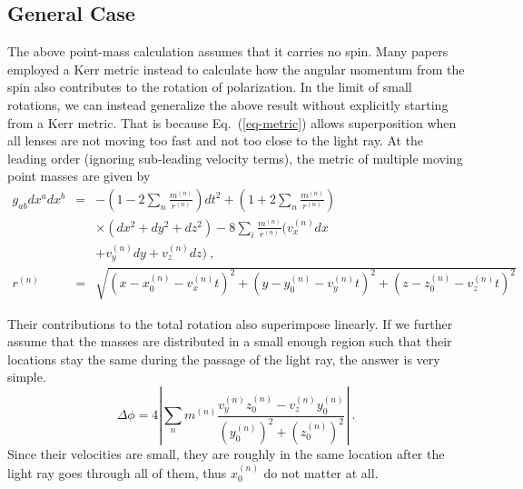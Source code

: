 \documentclass[aps,showpacs,twocolumn,floats,prd,superscriptaddress,nofootinbib]{revtex4}
\begin{document}
\subsection{General Case}

The above point-mass calculation assumes that it carries no spin. 
Many papers employed a Kerr metric instead to calculate how the angular momentum from the spin also contributes to the rotation of polarization. 
In the limit of small rotations, we can instead generalize the above result without explicitly starting from a Kerr metric. 
That is because Eq.~(\ref{eq-metric}) allows superposition when all lenses are not moving too fast and not too close to the light ray. 
At the leading order (ignoring sub-leading velocity terms), the metric of multiple moving point masses are given by
\begin{eqnarray}
g_{ab}dx^adx^b &=& -\left( 1 - 2\sum_n \frac{m^{(n)}}{r^{(n)}} \right)dt^2
+\left( 1 + 2\sum_n \frac{m^{(n)}}{r^{(n)}} \right) \nonumber \\
&& \times (dx^2+dy^2+dz^2) 
 -8\sum_i \frac{m^{(n)} }{r^{(n)}}
\biggl(v^{(n)}_x dx   \nonumber\\
&& + v^{(n)}_y dy+ v^{(n)}_z dz\biggr)~, \nonumber\\
r^{(n)} &=& \sqrt{\left(x - x_0^{(n)} - v^{(n)}_x t\right)^2 + \left(y - y_0^{(n)} - v^{(n)}_y t\right)^2 
+ \left(z - z_0^{(n)} - v^{(n)}_z t\right)^2}
\end{eqnarray}

Their contributions to the total rotation also superimpose linearly. 
If we further assume that the masses are distributed in a small enough region such that their locations stay the same during the passage of the light ray, the answer is very simple. 
\begin{equation}
\Delta\phi = 4 \left| \sum_n m^{(n)} \frac{v_y^{(n)}z_0^{(n)} - v_z^{(n)}y_0^{(n)}}
{\left(y_0^{(n)}\right)^2+\left(z_0^{(n)}\right)^2} \right|~.
\label{eq-combine}
\end{equation}
Since their velocities are small, they are roughly in the same location after the light ray goes through all of them, thus $x_0^{(n)}$ do not matter at all. 
\end{document}
